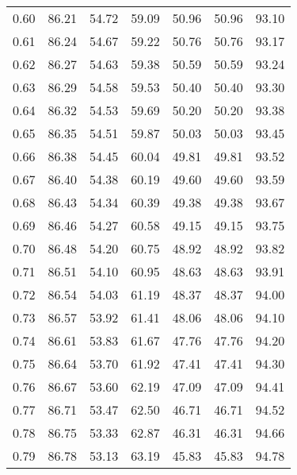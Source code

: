 \begin{tabular}{|c|c|c|c|c|c|c|}
      0.60 &     86.21 &     54.72 &      59.09 &   50.96 &      50.96 &         93.10 \\
      0.61 &     86.24 &     54.67 &      59.22 &   50.76 &      50.76 &         93.17 \\
      0.62 &     86.27 &     54.63 &      59.38 &   50.59 &      50.59 &         93.24 \\
      0.63 &     86.29 &     54.58 &      59.53 &   50.40 &      50.40 &         93.30 \\
      0.64 &     86.32 &     54.53 &      59.69 &   50.20 &      50.20 &         93.38 \\
      0.65 &     86.35 &     54.51 &      59.87 &   50.03 &      50.03 &         93.45 \\
      0.66 &     86.38 &     54.45 &      60.04 &   49.81 &      49.81 &         93.52 \\
      0.67 &     86.40 &     54.38 &      60.19 &   49.60 &      49.60 &         93.59 \\
      0.68 &     86.43 &     54.34 &      60.39 &   49.38 &      49.38 &         93.67 \\
      0.69 &     86.46 &     54.27 &      60.58 &   49.15 &      49.15 &         93.75 \\
      0.70 &     86.48 &     54.20 &      60.75 &   48.92 &      48.92 &         93.82 \\
      0.71 &     86.51 &     54.10 &      60.95 &   48.63 &      48.63 &         93.91 \\
      0.72 &     86.54 &     54.03 &      61.19 &   48.37 &      48.37 &         94.00 \\
      0.73 &     86.57 &     53.92 &      61.41 &   48.06 &      48.06 &         94.10 \\
      0.74 &     86.61 &     53.83 &      61.67 &   47.76 &      47.76 &         94.20 \\
      0.75 &     86.64 &     53.70 &      61.92 &   47.41 &      47.41 &         94.30 \\
      0.76 &     86.67 &     53.60 &      62.19 &   47.09 &      47.09 &         94.41 \\
      0.77 &     86.71 &     53.47 &      62.50 &   46.71 &      46.71 &         94.52 \\
      0.78 &     86.75 &     53.33 &      62.87 &   46.31 &      46.31 &         94.66 \\
      0.79 &     86.78 &     53.13 &      63.19 &   45.83 &      45.83 &         94.78 \\

\end{tabular}
